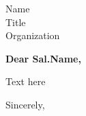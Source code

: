 \documentclass[12pt]{letter}
\begin{document}

\begin{letter}{Name \\ Title \\ Organization } %


\opening{\textbf{Dear Sal.\@ Name,}}
 
Text here

\vspace{2\parskip} %
\closing{Sincerely,}
\vspace{2\parskip} %




\end{letter}
 
\end{document}
